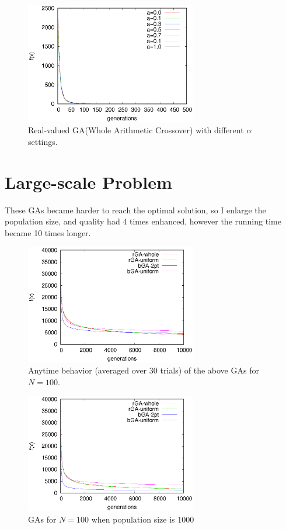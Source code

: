 ﻿\documentclass[conference]{IEEEtran}
\begin{document}
\begin{CJK}{UTF8}{bsmi}
\begin{figure}[htbp]
\centerline{\includegraphics[width=7.5cm]{fig/rGA/change_a_whole.eps}}
\caption{Real-valued GA(Whole Arithmetic Crossover) with different $\alpha$ settings.}
\label{fig}
\end{figure}


\section{Large-scale Problem}
These GAs became harder to reach the optimal solution, so I enlarge the population size, and quality had 4 times enhanced, however the running time became 10 times longer.
\begin{figure}[htbp]
\centerline{\includegraphics[width=7.5cm]{fig/cmp4GA/4GAs-P100N100G10000.eps}}
\caption{Anytime behavior (averaged over 30 trials) of the above GAs for $N=100$.}
\label{fig}
\end{figure}

\begin{figure}[htbp]
\centerline{\includegraphics[width=7.5cm]{fig/cmp4GA/4GAs-P1000N100G10000.eps}}
\caption{GAs for $N=100$ when population size is 1000}
\label{fig}
\end{figure}


\vspace{12pt}
\end{CJK}
\end{document}

